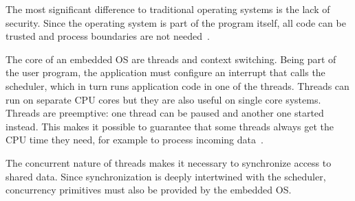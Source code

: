 The most significant difference to traditional operating systems is the lack of security. Since the
operating system is part of the program itself, all code can be trusted and process boundaries are
not needed~\cite{modern-os-embedded-os}.

The core of an embedded OS are threads and context switching. Being part of the user program, the
application must configure an interrupt that calls the scheduler, which in turn runs application
code in one of the threads. Threads can run on separate CPU cores but they are also useful on single
core systems. Threads are preemptive: one thread can be paused and another one started instead. This
makes it possible to guarantee that some threads always get the CPU time they need, for example to
process incoming data~\cite{freertos-fundamentals}.

The concurrent nature of threads makes it necessary to synchronize access to shared data. Since
synchronization is deeply intertwined with the scheduler, concurrency primitives must also be
provided by the embedded OS.
